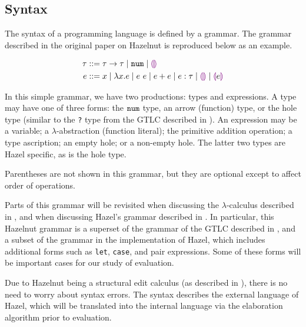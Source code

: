 \subsection{Syntax}
\label{sec:syntax}

The syntax of a programming language is defined by a grammar. The grammar described in the original paper on Hazelnut \cite{conf/popl/Hazelnut17} is reproduced below as an example.

\begin{singlespace}
  \begin{align*}
    \tau &::= \tau\to\tau
         \mid\mathtt{num}
         \mid\textcolor{violet}{\llparenthesis}\textcolor{violet}{\rrparenthesis} \\
    e &::= x
         \mid\lambda x.e
         \mid e\ e
         \mid e+e
         \mid e:\tau
         \mid\textcolor{violet}{\llparenthesis}\textcolor{violet}{\rrparenthesis}
         \mid\textcolor{violet}{\llparenthesis} e\textcolor{violet}{\rrparenthesis}
  \end{align*}
\end{singlespace}

In this simple grammar, we have two productions: types and expressions. A type may have one of three forms: the $\mathtt{num}$ type, an arrow (function) type, or the hole type (similar to the \texttt{?} type from the GTLC described in ). An expression may be a variable; a $\lambda$-abstraction (function literal); the primitive addition operation; a type ascription; an empty hole; or a non-empty hole. The latter two types are Hazel specific, as is the hole type.

Parentheses are not shown in this grammar, but they are optional except to affect order of operations.

Parts of this grammar will be revisited when discussing the $\lambda$-calculus described in , and when discussing Hazel's grammar described in . In particular, this Hazelnut grammar is a superset of the grammar of the GTLC described in , and a subset of the grammar in the implementation of Hazel, which includes additional forms such as \texttt{let}, \texttt{case}, and pair expressions. Some of these forms will be important cases for our study of evaluation.

Due to Hazelnut being a structural edit calculus (as described in ), there is no need to worry about syntax errors. The syntax describes the external language of Hazel, which will be translated into the internal language via the elaboration algorithm prior to evaluation.

